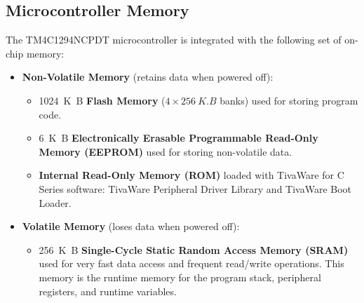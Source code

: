 \documentclass{article}
\begin{document}
\subsection{Microcontroller Memory}
The TM4C1294NCPDT microcontroller is integrated with the following set
of on-chip memory:
\begin{itemize}
    \item \textbf{Non-Volatile Memory} (retains data when powered off):
          \begin{itemize}
              \item \qty{1024}{K.B} \textbf{Flash Memory} (\(4 \times \qty{256}{K.B}\) banks) used for storing program code.
              \item \qty{6}{K.B} \textbf{Electronically Erasable Programmable Read-Only Memory (EEPROM)} used for storing non-volatile data.
              \item \textbf{Internal Read-Only Memory (ROM)} loaded with
                    TivaWare for C Series software: TivaWare Peripheral
                    Driver Library and TivaWare Boot Loader.
          \end{itemize}
    \item \textbf{Volatile Memory} (loses data when powered off):
          \begin{itemize}
              \item \qty{256}{K.B} \textbf{Single-Cycle Static Random Access Memory (SRAM)} used for very fast data access and frequent
                    read/write operations. This memory is the runtime memory for the
                    program stack, peripheral registers, and runtime variables.
          \end{itemize}
\end{itemize}
\end{document}
